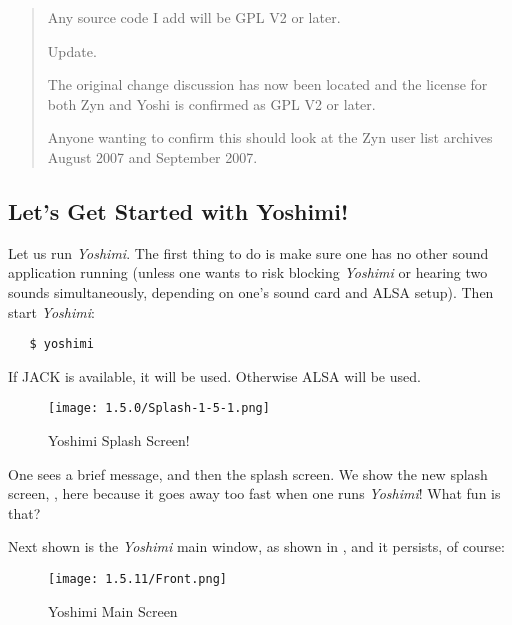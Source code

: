 \documentclass[
 11pt,
 twoside,
 a4paper,
 final                                 %
]{article}
\begin{document}
\begin{quotation}
      Any source code I add will be GPL V2 or later.

      Update.

      The original change discussion has now been located and the license for
      both Zyn and Yoshi is confirmed as GPL V2 or later.

      Anyone wanting to confirm this should look at the Zyn user list archives
      August 2007 and September 2007.
   \end{quotation}

\subsection{Let's Get Started with Yoshimi!}
\label{subsec:introduction_lets_get_started}

   Let us run \textsl{Yoshimi}.
   The first
   thing to do is make sure one has no other sound application running
   (unless one wants to risk blocking \textsl{Yoshimi} or hearing two sounds
   simultaneously, depending on one's sound card and ALSA setup).
   Then start \textsl{Yoshimi}:

\begin{verbatim}
   $ yoshimi
\end{verbatim}

   If JACK is available, it will be used.  Otherwise ALSA will be used.

\begin{figure}[H]
   \centering
   \texttt{[image: 1.5.0/Splash-1-5-1.png]}
   \caption{Yoshimi Splash Screen!}
   \label{fig:yoshimi_splash_screen}
\end{figure}

   One sees a brief message, and then the splash screen.
   We show the new splash screen, ,
   here because it goes away too fast when one runs \textsl{Yoshimi}!
   What fun is that?

   Next shown is the \textsl{Yoshimi} main window,
   as shown in ,
   and it persists, of course:

\begin{figure}[H]
   \centering
   \texttt{[image: 1.5.11/Front.png]}
   \caption{Yoshimi Main Screen}
   \label{fig:yoshimi_main_screen}
\end{figure}
\end{document}
